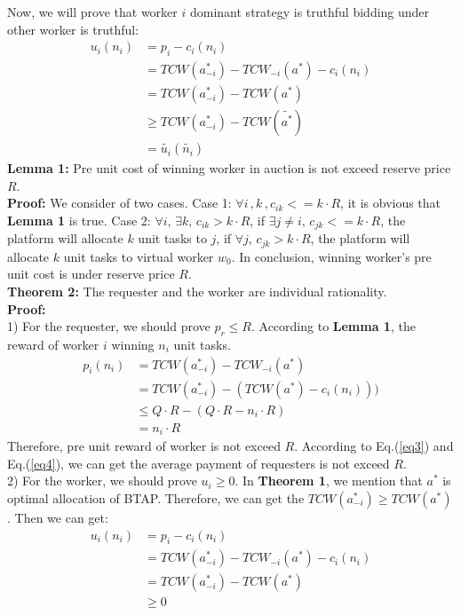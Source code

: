 Now, we will prove that worker $i$ dominant strategy is truthful bidding under other worker is truthful:
$$
\begin{aligned}
  u_i(n_i) & = p_i - c_i(n_i) \\
        {} & = TCW(a_{-i}^{\ast}) - TCW_{-i}(a^{\ast}) - c_i(n_i)\\
        {} & = TCW(a_{-i}^{\ast}) - TCW(a^{\ast})\\
        {} & \geq TCW(a_{-i}^{\ast}) - TCW(\tilde{a^{\ast}})\\
        {} & = \tilde{u_i}(\tilde{n_i})
\end{aligned}
$$
\textbf{Lemma 1:} Pre unit cost of winning worker in auction is not exceed reserve price $R$.\\
\textbf{Proof:} We consider of two cases. Case 1: $\forall i \, ,k\, , c_{ik} <= k \cdot R$, it is obvious that \textbf{Lemma 1} is true. Case 2: $\forall i , \, \exists k ,\, c_{ik} > k \cdot R$, if $\exists j \neq i ,\, c_{jk} <= k \cdot R$, the platform will allocate $k$ unit tasks to $j$, if $\forall j ,\, c_{jk} > k \cdot R$, the platform will allocate $k$ unit tasks to virtual worker $w_0$. In conclusion, winning worker's pre unit cost is under reserve price $R$.\\
\textbf{Theorem 2:} The requester and the worker are individual rationality.\\
\textbf{Proof:}\\
1) For the requester, we should prove $p_r \leq R$. According to \textbf{Lemma 1}, the reward of worker $i$ winning $n_i$ unit tasks.
$$
\begin{aligned}
p_i(n_i) & = TCW(a_{-i}^{\ast}) - TCW_{-i}(a^{\ast}) \\
{}       & = TCW(a_{-i}^{\ast}) - (TCW(a^{\ast}) - c_i(n_i)))\\
{}       & \leq Q\cdot R - (Q\cdot R - n_i\cdot R)\\
{}       & = n_i \cdot R
\end{aligned}
$$
Therefore, pre unit reward of worker is not exceed $R$. According to Eq.(\ref{eq3}) and Eq.(\ref{eq4}), we can get the average payment of requesters is not exceed $R$.\\
 2) For the worker, we should prove $u_i \geq 0$. In \textbf{Theorem 1}, we mention that $a^{\ast}$ is optimal allocation of BTAP. Therefore, we can get the $TCW(a_{-i}^{\ast}) \geq TCW(a^{\ast})$. Then we can get:
 $$
  \begin{aligned}
    u_i(n_i) & = p_i - c_i(n_i) \\
        {} & = TCW(a_{-i}^{\ast}) - TCW_{-i}(a^{\ast}) - c_i(n_i)\\
        {} & = TCW(a_{-i}^{\ast}) - TCW(a^{\ast})\\
        {} & \geq 0
  \end{aligned}
 $$
